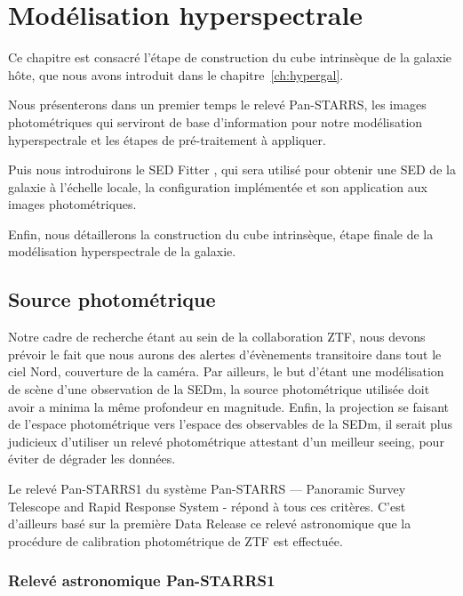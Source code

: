 \documentclass[../main/main.tex]{subfiles}
\begin{document}
\setcounter{chapter}{4}
\chapter{Modélisation hyperspectrale}\label{ch:modelhyperspec}

\minitoc
\vspace{2cm}
Ce chapitre est consacré l'étape de construction du cube intrinsèque de
la galaxie hôte, que nous avons introduit dans le
chapitre~\ref{ch:hypergal}.

Nous présenterons dans un premier temps le relevé Pan-STARRS, les images photométriques
qui serviront de base d'information pour notre modélisation hyperspectrale et les
étapes de pré-traitement à appliquer.

Puis nous introduirons le SED Fitter , qui sera utilisé pour
obtenir une SED de la galaxie à l'échelle locale, la configuration
implémentée et son application aux images photométriques.

Enfin, nous détaillerons la construction du cube intrinsèque, étape
finale de la modélisation hyperspectrale de la galaxie.
\newpage

\section{Source photométrique}
\label{sec:photosource}

Notre cadre de recherche étant au sein de la collaboration ZTF, nous
devons prévoir le fait que nous aurons des alertes d'évènements
transitoire dans tout le ciel Nord, couverture de la caméra. Par
ailleurs, le but d'\hypergal étant une modélisation de scène d'une
observation de la SEDm, la source photométrique utilisée doit avoir a
minima la même profondeur en magnitude. Enfin, la projection se faisant
de l'espace photométrique vers l'espace des observables de la SEDm, il
serait plus judicieux d'utiliser un relevé photométrique attestant d'un
meilleur seeing, pour éviter de dégrader les données.

Le relevé Pan-STARRS1 du système Pan-STARRS — Panoramic Survey Telescope and Rapid
Response System - \citep{Kaiser2002,Kaiser2010} répond à tous ces critères. C'est d'ailleurs basé sur
la première Data Release ce relevé astronomique que la procédure de calibration photométrique
de ZTF est effectuée.

\subsection{Relevé astronomique Pan-STARRS1}
\label{ssec:ps1}
\end{document}
